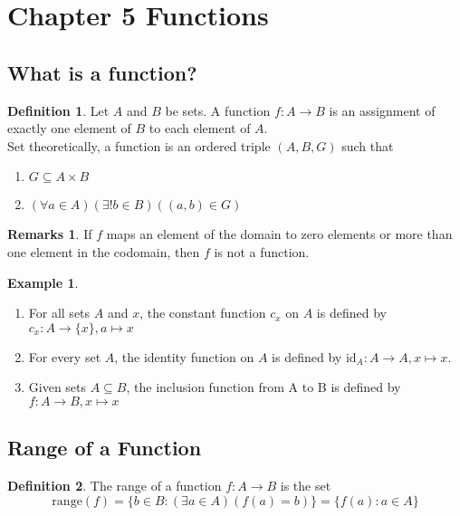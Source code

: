 \documentclass[14pt]{article}
\theoremstyle{definition}
\newtheorem*{remark}{Remarks}
\newtheorem*{example}{Example}
\newtheorem{definition}{Definition}[subsection]
\begin{document}
\section{Chapter 5 Functions}
\subsection{What is a function?}
\begin{definition}
    Let $A$ and $B$ be sets. A function $f\colon A\rightarrow B $ is an assignment of exactly one element of $B$ to each element of $A$. 
\\ Set theoretically, a function is an ordered triple $(A, B, G)$ such that
\begin{enumerate}
    \item $G\subseteq A\times B$
    \item $(\forall a\in A )(\exists !b\in B)((a,b)\in G)$
\end{enumerate}
\end{definition}

\begin{remark}
    If $f$ maps an element of the domain to zero elements or more than one element in the codomain, then $f$ is not a function.
\end{remark}

\begin{example}\hfill
    \begin{enumerate}
    \item For all sets $A$ and $x$, the constant function $c_x$ on $A$ is defined by $c_x\colon A\rightarrow \{x\}, a\mapsto x$
    \item For every set $A$, the identity function on $A$ is defined by $\mathrm{id}_A\colon A\rightarrow A, x\mapsto x$.
    \item Given sets $A\subseteq B $, the inclusion function from A to B is defined by $f\colon A\rightarrow B, x\mapsto x$
\end{enumerate}
\end{example}


\vspace{5mm} %

\subsection{Range of a Function}
\begin{definition}
    The range of a function $f\colon A\rightarrow B $ is the set 
\begin{equation*}
    \mathrm{range}(f)=\{ b\in B\colon ( \exists a\in A)(f(a)=b)\}=\{f(a)\colon a\in A\}
\end{equation*}
\end{definition}
\end{document}
